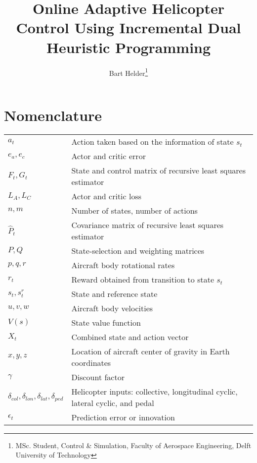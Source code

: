 \documentclass[conf]{new-aiaa} %
\title{Online Adaptive Helicopter Control Using Incremental Dual Heuristic Programming}
\author{Bart Helder\footnote{MSc. Student, Control \& Simulation, Faculty of Aerospace Engineering, Delft University of Technology}}
\affil{Delft University of Technology, The Netherlands}
\begin{document}
\maketitle

\begin{abstract}

\end{abstract}

\section*{Nomenclature}


{\renewcommand\arraystretch{1.0}
\noindent\begin{longtable*}{@{}l @{\quad=\quad} l@{}}
$a_t$               & Action taken based on the information of state $s_t$ \\
$e_a, e_c$          & Actor and critic error \\
$F_t, G_t$          & State and control matrix of recursive least squares estimator \\
$L_A, L_C$          & Actor and critic loss \\ 
$n, m$              & Number of states, number of actions\\
$\hat{P}_t$         & Covariance matrix of recursive least squares estimator \\
$P, Q$              & State-selection and weighting matrices \\
$p, q, r$           & Aircraft body rotational rates \\
$r_{t}$             & Reward obtained from transition to state $s_t$ \\
$s_t, s^r_t$        & State and reference state \\
$u, v, w$           & Aircraft body velocities \\
$V(s) $             & State value function \\
$X_t$               & Combined state and action vector \\ 
$x, y, z$           & Location of aircraft center of gravity in Earth coordinates \\
$\gamma$            & Discount factor \\
$\delta_{col}, \delta_{lon}, \delta_{lat}, \delta_{ped}$ & Helicopter inputs: collective, longitudinal cyclic, lateral cyclic, and pedal \\
$\epsilon_t$        & Prediction error or innovation \\

\end{longtable*}}
\end{document}
